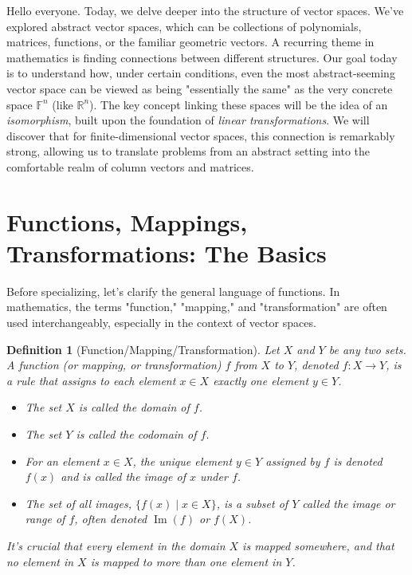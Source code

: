 \documentclass[11pt, letterpaper]{article}
\theoremstyle{mytheoremstyle}
\theoremstyle{mydefinitionstyle}
\newtheorem{definition}[theorem]{Definition}
\theoremstyle{myremarkstyle}
\newcommand{\F}{\mathbb{F}}
\newcommand{\R}{\mathbb{R}}
\DeclareMathOperator{\im}{Im} %
\begin{document}
Hello everyone. Today, we delve deeper into the structure of vector spaces. We've explored abstract vector spaces, which can be collections of polynomials, matrices, functions, or the familiar geometric vectors. A recurring theme in mathematics is finding connections between different structures. Our goal today is to understand how, under certain conditions, even the most abstract-seeming vector space can be viewed as being "essentially the same" as the very concrete space $\F^n$ (like $\R^n$). The key concept linking these spaces will be the idea of an \emph{isomorphism}, built upon the foundation of \emph{linear transformations}. We will discover that for finite-dimensional vector spaces, this connection is remarkably strong, allowing us to translate problems from an abstract setting into the comfortable realm of column vectors and matrices.

\section{Functions, Mappings, Transformations: The Basics}

Before specializing, let's clarify the general language of functions. In mathematics, the terms "function," "mapping," and "transformation" are often used interchangeably, especially in the context of vector spaces.

\begin{definition}[Function/Mapping/Transformation]
Let $X$ and $Y$ be any two sets. A \emph{function} (or \emph{mapping}, or \emph{transformation}) $f$ from $X$ to $Y$, denoted $f: X \to Y$, is a rule that assigns to \emph{each} element $x \in X$ \emph{exactly one} element $y \in Y$.
\begin{itemize}
    \item The set $X$ is called the \emph{domain} of $f$.
    \item The set $Y$ is called the \emph{codomain} of $f$.
    \item For an element $x \in X$, the unique element $y \in Y$ assigned by $f$ is denoted $f(x)$ and is called the \emph{image} of $x$ under $f$.
    \item The set of all images, $\{f(x) \mid x \in X\}$, is a subset of $Y$ called the \emph{image} or \emph{range} of $f$, often denoted $\im(f)$ or $f(X)$.
\end{itemize}
It's crucial that every element in the domain $X$ is mapped somewhere, and that no element in $X$ is mapped to more than one element in $Y$.
\end{definition}
\end{document}
